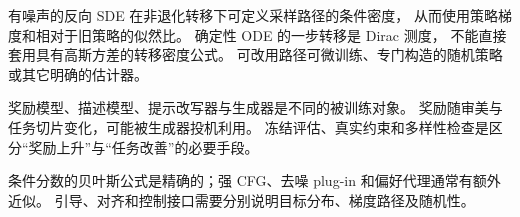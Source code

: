 有噪声的反向 SDE 在非退化转移下可定义采样路径的条件密度，
从而使用策略梯度和相对于旧策略的似然比。
确定性 ODE 的一步转移是 Dirac 测度，
不能直接套用具有高斯方差的转移密度公式。
可改用路径可微训练、专门构造的随机策略或其它明确的估计器。

奖励模型、描述模型、提示改写器与生成器是不同的被训练对象。
奖励随审美与任务切片变化，可能被生成器投机利用。
冻结评估、真实约束和多样性检查是区分“奖励上升”与“任务改善”的必要手段。

\begin{theorytakeaway}
条件分数的贝叶斯公式是精确的；强 CFG、去噪 plug-in 和偏好代理通常有额外近似。
引导、对齐和控制接口需要分别说明目标分布、梯度路径及随机性。
\end{theorytakeaway}
